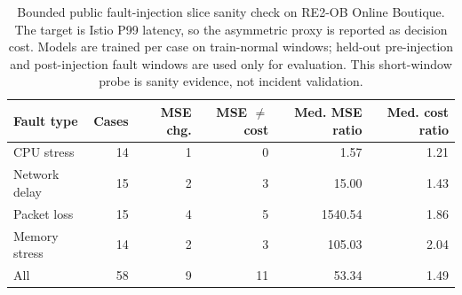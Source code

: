\begin{table}[t]
\centering
\caption{Bounded public fault-injection slice sanity check on RE2-OB Online Boutique. The target is Istio P99 latency, so the asymmetric proxy is reported as decision cost. Models are trained per case on train-normal windows; held-out pre-injection and post-injection fault windows are used only for evaluation. This short-window probe is sanity evidence, not incident validation.}
\label{tab:public-fault-slice}
\tiny
\setlength{\tabcolsep}{2pt}
\begin{tabular}{lrrrrr}
\toprule
Fault type & Cases & MSE chg. & MSE $\ne$ cost & Med. MSE ratio & Med. cost ratio \\
\midrule
CPU stress & 14 & 1 & 0 & 1.57 & 1.21 \\
Network delay & 15 & 2 & 3 & 15.00 & 1.43 \\
Packet loss & 15 & 4 & 5 & 1540.54 & 1.86 \\
Memory stress & 14 & 2 & 3 & 105.03 & 2.04 \\
\midrule
All & 58 & 9 & 11 & 53.34 & 1.49 \\
\bottomrule
\end{tabular}
\end{table}
